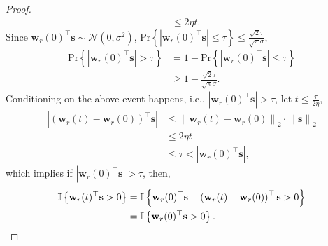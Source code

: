 \documentclass[10pt]{article}
\def\rvs{{\mathbf{s}}}
\def\rvw{{\mathbf{w}}}
\def\pr{{\text{Pr}}}
\def\sI{{\mathbb{I}}}
\def\gN{{\mathcal{N}}}
\begin{document}
\begin{proof}
\begin{equation*}
\begin{split}
	&\le 2 \eta t .
\end{split}
\end{equation*}
Since $\rvw_r(0)^\top \rvs \sim \gN(0, \sigma^2)$, $\pr\left\{ \left| \rvw_r(0)^\top \rvs \right| \le \tau\right\} \le  \frac{\sqrt{2}\tau}{\sqrt{\pi}\sigma}$,
\begin{equation*}
\begin{split}
	\pr\left\{ \left| \rvw_r(0)^\top \rvs \right| > \tau\right\} &= 1 - \pr\left\{ \left| \rvw_r(0)^\top \rvs \right| \le \tau\right\} \\
	&\ge 1 - \frac{\sqrt{2}\tau}{\sqrt{\pi}\sigma}.
\end{split}
\end{equation*}
Conditioning on the above event happens, i.e., $ \left| \rvw_r(0)^\top \rvs \right| > \tau$, let $t \le \frac{\tau}{ 2 \eta }$,
\begin{equation*}
\begin{split}
	\left| \left( \rvw_r(t) - \rvw_r(0) \right)^\top \rvs \right| &\le \left\| \rvw_r(t) - \rvw_r(0) \right\|_2 \cdot \left\| \rvs \right\|_2 \\
	&\le 2 \eta t \\
	&\le \tau < \left| \rvw_r(0)^\top \rvs \right|,
\end{split}
\end{equation*}
which implies if $\left| \rvw_r(0)^\top \rvs \right| > \tau$, then,
\begin{equation*}
\begin{split}
	\sI\left\{ \rvw_r(t)^\top \rvs > 0 \right\} &= \sI\left\{ \rvw_r(0)^\top \rvs  + \left( \rvw_r(t) - \rvw_r(0) \right)^\top \rvs > 0 \right\} \\
	&= \sI\left\{ \rvw_r(0)^\top \rvs > 0 \right\}. \qedhere
\end{split}
\end{equation*}
\end{proof}
\end{document}
